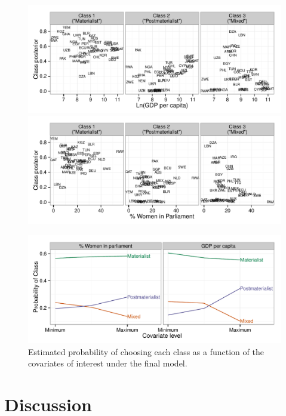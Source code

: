 \documentclass[letterpaper,12pt]{article}
\begin{document}
\begin{figure}
	\includegraphics[width=\textwidth]{figures/gdp-posterior.pdf}
	
	\includegraphics[width=\textwidth]{figures/women-posterior.pdf}

	\caption{\label{fig:posterior}}
\end{figure}

\begin{figure}
	\includegraphics[width=\textwidth]{figures/covariates.pdf}
	\caption{\label{fig:covariates}Estimated probability of choosing each class as a function of the covariates of interest under the final model.}
\end{figure}


\section{Discussion}
\end{document}
